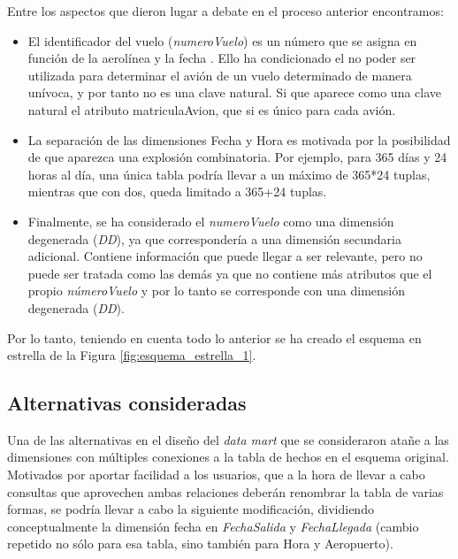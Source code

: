 \documentclass{article}
\begin{document}
Entre los aspectos que dieron lugar a debate en el proceso anterior encontramos:
\begin{itemize}
    \item El identificador del vuelo (\textit{numeroVuelo}) es un número que se asigna en función de la aerolínea y la fecha \cite{wiki:1}. Ello ha condicionado el no poder ser utilizada para determinar el avión de un vuelo determinado de manera unívoca, y por tanto no es una clave natural. Si que aparece como una clave natural el atributo matriculaAvion, que si es único para cada avión.
    \item La separación de las dimensiones Fecha y Hora es motivada por la posibilidad de que aparezca una explosión combinatoria. Por ejemplo, para 365 días y 24 horas al día, una única tabla podría llevar a un máximo de 365*24 tuplas, mientras que con dos, queda limitado a 365+24 tuplas.
    \item Finalmente, se ha considerado el \textit{numeroVuelo} como una dimensión degenerada (\textit{DD}), ya que correspondería a una dimensión secundaria adicional. Contiene información que puede llegar a ser relevante, pero no puede ser tratada como las demás ya que no contiene más atributos que el propio \textit{númeroVuelo} y por lo tanto se corresponde con una dimensión degenerada (\textit{DD}).
\end{itemize}

Por lo tanto, teniendo en cuenta todo lo anterior se ha creado el esquema en estrella de la Figura \ref{fig:esquema_estrella_1}.

\subsection{Alternativas consideradas}

Una de las alternativas en el diseño del \textit{data mart} que se consideraron atañe a las dimensiones con múltiples conexiones a la tabla de hechos en el esquema original. Motivados por aportar facilidad a los usuarios, que a la hora de llevar a cabo consultas que aprovechen ambas relaciones deberán renombrar la tabla de varias formas, se podría llevar a cabo la siguiente modificación, dividiendo conceptualmente la dimensión fecha en \textit{FechaSalida} y \textit{FechaLlegada} (cambio repetido no sólo para esa tabla, sino también para Hora y Aeropuerto).
\end{document}
